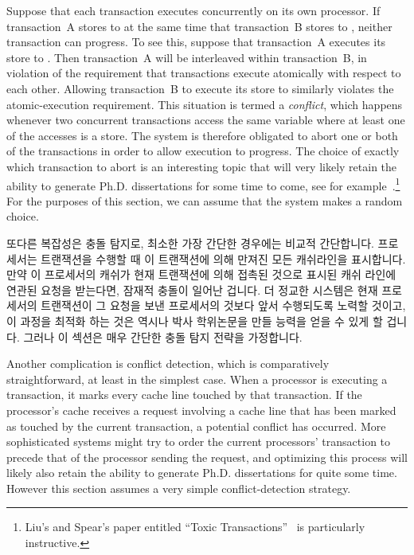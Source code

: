 Suppose that each transaction executes concurrently on its own processor.
If transaction~A stores to  at the same time that transaction~B
stores to , neither transaction can progress.
To see this, suppose that transaction~A executes its store to .
Then transaction~A will be interleaved within transaction~B, in violation
of the requirement that transactions execute atomically with respect to
each other.
Allowing transaction~B to execute its store to  similarly violates
the atomic-execution requirement.
This situation is termed a \emph{conflict}, which happens whenever two
concurrent transactions access the same variable where at least one of
the accesses is a store.
The system is therefore obligated to abort one or both of the transactions
in order to allow execution to progress.
The choice of exactly which transaction to abort is an interesting topic
that will very likely retain the ability to generate Ph.D. dissertations for
some time to come, see for
example~\cite{EgeAkpinar2011HTM2TLE}.\footnote{
	Liu's and Spear's paper entitled ``Toxic
	Transactions''~\cite{YujieLiu2011ToxicTransactions} is
	particularly instructive.}
For the purposes of this section, we can assume that the system makes
a random choice.

\fi

또다른 복잡성은 충돌 탐지로, 최소한 가장 간단한 경우에는 비교적 간단합니다.
프로세서는 트랜잭션을 수행할 때 이 트랜잭션에 의해 만져진 모든 캐쉬라인을
표시합니다.
만약 이 프로세서의 캐쉬가 현재 트랜잭션에 의해 접촉된 것으로 표시된 캐쉬 라인에
연관된 요청을 받는다면, 잠재적 충돌이 일어난 겁니다.
더 정교한 시스템은 현재 프로세서의 트랜잭션이 그 요청을 보낸 프로세서의 것보다
앞서 수행되도록 노력할 것이고, 이 과정을 최적화 하는 것은 역시나 박사
학위논문을 만들 능력을 얻을 수 있게 할 겁니다.
그러나 이 섹션은 매우 간단한 충돌 탐지 전략을 가정합니다.

\iffalse

Another complication is conflict detection, which is comparatively
straightforward, at least in the simplest case.
When a processor is executing a transaction, it marks every cache line
touched by that transaction.
If the processor's cache receives a request involving a cache line that
has been marked as touched by the current transaction, a potential
conflict has occurred.
More sophisticated systems might try to order the current processors'
transaction to precede that of the processor sending the request, and
optimizing this process will likely also retain the ability to generate
Ph.D. dissertations for quite some time.
However this section assumes a very simple conflict-detection strategy.

